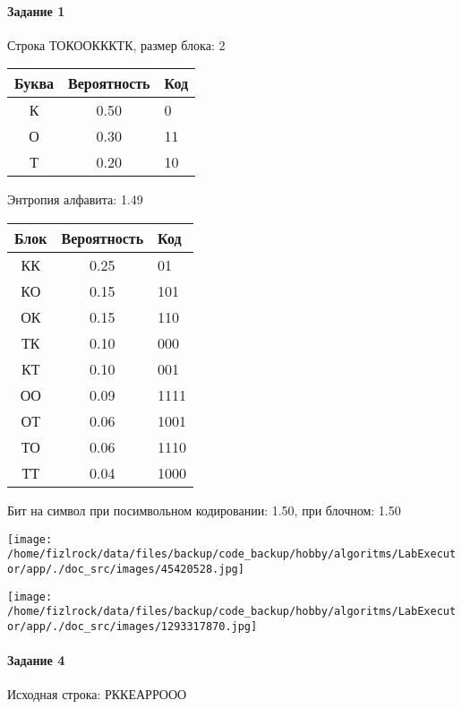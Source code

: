 \documentclass[a4paper, 12pt]{article}
\begin{document}
\paragraph{Задание 1}

Строка ТОКООКККТК, размер блока: 2
\begin{center}
 \begin{tabular}{ |c|c|l| } 
  \hline
     Буква & Вероятность & Код\\ \hline
К & 0.50 & 0\\\hline
О & 0.30 & 11\\\hline
Т & 0.20 & 10
\\ \hline \end{tabular}
\end{center}
Энтропия алфавита: 1.49
\begin{center}
 \begin{tabular}{ |c|c|l| } 
  \hline
     Блок & Вероятность & Код\\ \hline
КК & 0.25 & 01\\\hline
КО & 0.15 & 101\\\hline
ОК & 0.15 & 110\\\hline
ТК & 0.10 & 000\\\hline
КТ & 0.10 & 001\\\hline
ОО & 0.09 & 1111\\\hline
ОТ & 0.06 & 1001\\\hline
ТО & 0.06 & 1110\\\hline
ТТ & 0.04 & 1000
\\ \hline \end{tabular}
\end{center}
Бит на символ при посимвольном кодировании: 1.50, при блочном: 1.50

\texttt{[image: /home/fizlrock/data/files/backup/code\_backup/hobby/algoritms/LabExecutor/app/./doc\_src/images/45420528.jpg]}

\texttt{[image: /home/fizlrock/data/files/backup/code\_backup/hobby/algoritms/LabExecutor/app/./doc\_src/images/1293317870.jpg]}
\paragraph{Задание 4}


Исходная строка: РККЕАРРООО
\end{document}
